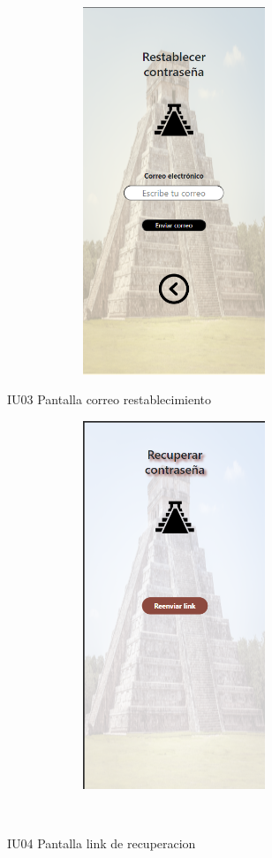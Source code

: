 \begin{figure}[htb]
    \begin{minipage}{1\textwidth}
    \centering
    \includegraphics[width=10cm, height=11cm]{entregable final/pantallasSistema/IU03 Pantalla correo restablecimiento.png}
    \caption{IU03 Pantalla correo restablecimiento}
\end{minipage}

    \begin{minipage}{1\textwidth}
        \centering
        \includegraphics[width=10cm, height=11cm]{entregable final/pantallasSistema/IU04 Pantalla link de recuperacion.png}
        \caption{IU04 Pantalla link de recuperacion}
    \end{minipage}
    \\
\end{figure}
